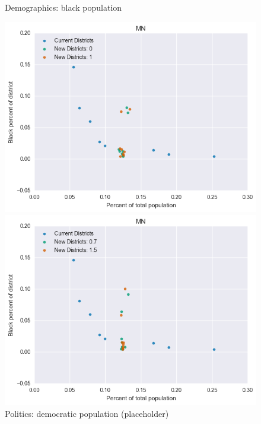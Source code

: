 \begin{figure}[htb!] \centering
\caption{ Demographics: black population }
\includegraphics[width=4.5in]{../analysis/MN/analysis_scatter.png}
\caption{ Politics: democratic population (placeholder)}
\includegraphics[width=4.5in]{../analysis/MN/analysis_scatter2.png}
\end{figure}

\clearpage
\newpage

